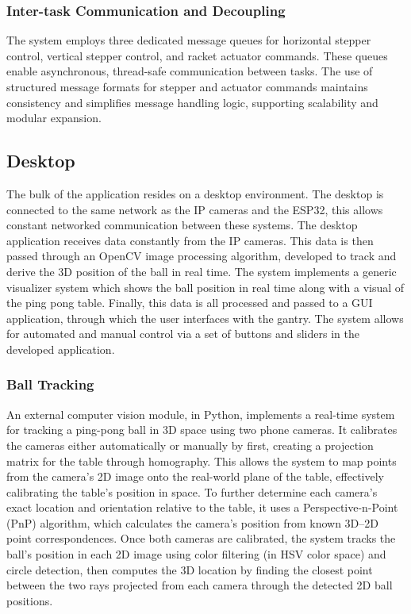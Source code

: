 \subsubsection{Inter-task Communication and Decoupling}
The system employs three dedicated message queues for horizontal stepper control, vertical stepper control, and racket actuator commands. These queues enable asynchronous, thread-safe communication between tasks. The use of structured message formats for stepper and actuator commands maintains consistency and simplifies message handling logic, supporting scalability and modular expansion.

\subsection{Desktop}
The bulk of the application resides on a desktop environment. The desktop is connected to the same network as the IP cameras and the ESP32, this allows constant networked communication between these systems. The desktop application receives data constantly from the IP cameras. This data is then passed through an OpenCV image processing algorithm, developed to track and derive the 3D position of the ball in real time. The system implements a generic visualizer system which shows the ball position in real time along with a visual of the ping pong table. Finally, this data is all processed and passed to a GUI application, through which the user interfaces with the gantry. The system allows for automated and manual control via a set of buttons and sliders in the developed application.

\subsubsection{Ball Tracking}
An external computer vision module, in Python, implements a real-time system for tracking a ping-pong ball in 3D space using two phone cameras. It calibrates the cameras either automatically or manually by first, creating a projection matrix for the table through homography. This allows the system to map points from the camera’s 2D image onto the real-world plane of the table, effectively calibrating the table’s position in space. To further determine each camera’s exact location and orientation relative to the table, it uses a Perspective-n-Point (PnP) algorithm, which calculates the camera's position from known 3D–2D point correspondences. Once both cameras are calibrated, the system tracks the ball’s position in each 2D image using color filtering (in HSV color space) and circle detection, then computes the 3D location by finding the closest point between the two rays projected from each camera through the detected 2D ball positions.

